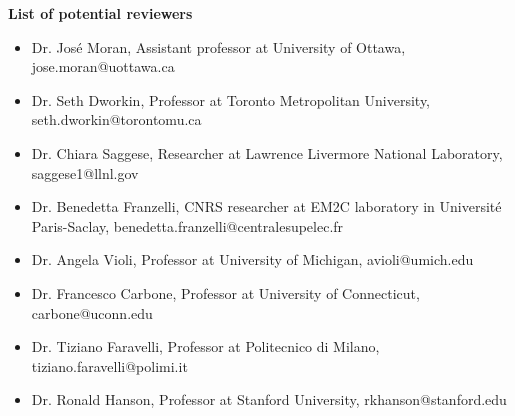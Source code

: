 \begin{titlepage}

\pagestyle{empty} %
\nolinenumbers

\textbf{\large{List of potential reviewers}}
\vspace{0.3cm}

\begin{itemize}
	\item Dr. José Moran, Assistant professor at University of Ottawa, jose.moran@uottawa.ca
	\item Dr. Seth Dworkin, Professor at Toronto Metropolitan University, seth.dworkin@torontomu.ca
	\item Dr. Chiara Saggese, Researcher at Lawrence Livermore National Laboratory, saggese1@llnl.gov
	\item Dr. Benedetta Franzelli, CNRS researcher at EM2C laboratory in Université Paris-Saclay, benedetta.franzelli@centralesupelec.fr
	\item Dr. Angela Violi, Professor at University of Michigan, avioli@umich.edu
	\item Dr. Francesco Carbone, Professor at University of Connecticut, carbone@uconn.edu
	\item Dr. Tiziano Faravelli, Professor at Politecnico di Milano, tiziano.faravelli@polimi.it
	\item Dr. Ronald Hanson, Professor at Stanford University, rkhanson@stanford.edu
\end{itemize}


\end{titlepage}